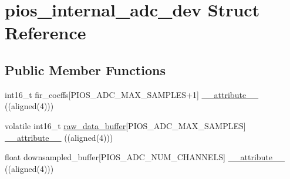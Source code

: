 \hypertarget{structpios__internal__adc__dev}{\section{pios\-\_\-internal\-\_\-adc\-\_\-dev \-Struct \-Reference}
\label{structpios__internal__adc__dev}
}
\subsection*{\-Public \-Member \-Functions}
\begin{DoxyCompactItemize}
\item 
int16\-\_\-t fir\-\_\-coeffs\mbox{[}\-P\-I\-O\-S\-\_\-\-A\-D\-C\-\_\-\-M\-A\-X\-\_\-\-S\-A\-M\-P\-L\-E\-S+1\mbox{]} \hyperlink{structpios__internal__adc__dev_a7d02d305d56906e363c9ec6af3701a12}{\-\_\-\-\_\-attribute\-\_\-\-\_\-} ((aligned(4)))
\item 
volatile int16\-\_\-t \*
\hyperlink{structpios__internal__adc__dev_ae000976122ea6b432ad96c6207f97ecd}{raw\-\_\-data\-\_\-buffer}\mbox{[}\-P\-I\-O\-S\-\_\-\-A\-D\-C\-\_\-\-M\-A\-X\-\_\-\-S\-A\-M\-P\-L\-E\-S\mbox{]} \hyperlink{structpios__internal__adc__dev_a31ebe9137afb824440104c09c2bee4a0}{\-\_\-\-\_\-attribute\-\_\-\-\_\-} ((aligned(4)))
\item 
float downsampled\-\_\-buffer\mbox{[}\-P\-I\-O\-S\-\_\-\-A\-D\-C\-\_\-\-N\-U\-M\-\_\-\-C\-H\-A\-N\-N\-E\-L\-S\mbox{]} \hyperlink{structpios__internal__adc__dev_a5c25b6024b528894526ca7aa52a8bb19}{\-\_\-\-\_\-attribute\-\_\-\-\_\-} ((aligned(4)))
\end{DoxyCompactItemize}

